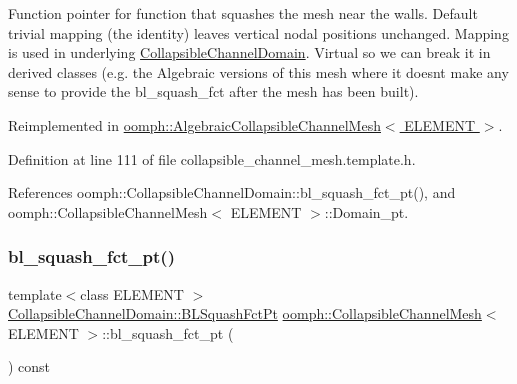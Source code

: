 Function pointer for function that squashes the mesh near the walls. Default trivial mapping (the identity) leaves vertical nodal positions unchanged. Mapping is used in underlying \hyperlink{classoomph_1_1CollapsibleChannelDomain}{Collapsible\+Channel\+Domain}. Virtual so we can break it in derived classes (e.\+g. the Algebraic versions of this mesh where it doesn\textquotesingle{}t make any sense to provide the bl\+\_\+squash\+\_\+fct after the mesh has been built). 



Reimplemented in \hyperlink{classoomph_1_1AlgebraicCollapsibleChannelMesh_abf1848b49f57419af4379a637464587d}{oomph\+::\+Algebraic\+Collapsible\+Channel\+Mesh$<$ E\+L\+E\+M\+E\+N\+T $>$}.



Definition at line 111 of file collapsible\+\_\+channel\+\_\+mesh.\+template.\+h.



References oomph\+::\+Collapsible\+Channel\+Domain\+::bl\+\_\+squash\+\_\+fct\+\_\+pt(), and oomph\+::\+Collapsible\+Channel\+Mesh$<$ E\+L\+E\+M\+E\+N\+T $>$\+::\+Domain\+\_\+pt.

\mbox{\label{classoomph_1_1CollapsibleChannelMesh_a5c073c93cce7e6b6e9de86f36cb1e965}} 
\subsubsection{\texorpdfstring{bl\+\_\+squash\+\_\+fct\+\_\+pt()}{bl\_squash\_fct\_pt()}\hspace{0.1cm}{\footnotesize\ttfamily [2/2]}}
{\footnotesize\ttfamily template$<$class E\+L\+E\+M\+E\+NT $>$ \\
\hyperlink{classoomph_1_1CollapsibleChannelDomain_a2bf1d7943bfac134a5c27a54c7e1faed}{Collapsible\+Channel\+Domain\+::\+B\+L\+Squash\+Fct\+Pt} \hyperlink{classoomph_1_1CollapsibleChannelMesh}{oomph\+::\+Collapsible\+Channel\+Mesh}$<$ E\+L\+E\+M\+E\+NT $>$\+::bl\+\_\+squash\+\_\+fct\+\_\+pt (\begin{DoxyParamCaption}{ }\end{DoxyParamCaption}) const\hspace{0.3cm}{\ttfamily [inline]}}



